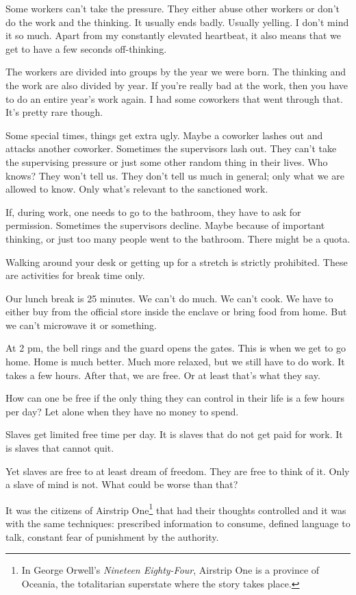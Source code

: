 Some workers can’t take the pressure. They either abuse other workers or don’t do the work and the thinking. It usually ends badly. Usually yelling. I don’t mind it so much. Apart from my constantly elevated heartbeat, it also means that we get to have a few seconds off-thinking.

The workers are divided into groups by the year we were born. The thinking and the work are also divided by year. If you’re really bad at the work, then you have to do an entire year’s work again. I had some coworkers that went through that. It’s pretty rare though.

Some special times, things get extra ugly. Maybe a coworker lashes out and attacks another coworker. Sometimes the supervisors lash out. They can’t take the supervising pressure or just some other random thing in their lives. Who knows? They won’t tell us. They don’t tell us much in general; only what we are allowed to know. Only what’s relevant to the sanctioned work.

If, during work, one needs to go to the bathroom, they have to ask for permission. Sometimes the supervisors decline. Maybe because of important thinking, or just too many people went to the bathroom. There might be a quota.

Walking around your desk or getting up for a stretch is strictly prohibited. These are activities for break time only.

Our lunch break is 25 minutes. We can’t do much. We can’t cook. We have to either buy from the official store inside the enclave or bring food from home. But we can’t microwave it or something.

At 2 pm, the bell rings and the guard opens the gates. This is when we get to go home. Home is much better. Much more relaxed, but we still have to do work. It takes a few hours. After that, we are free. Or at least that’s what they say.

How can one be free if the only thing they can control in their life is a few hours per day? Let alone when they have no money to spend.

Slaves get limited free time per day. It is slaves that do not get paid for work. It is slaves that cannot quit.

Yet slaves are free to at least dream of freedom. They are free to think of it. Only a slave of mind is not. What could be worse than that?

It was the citizens of Airstrip One\footnote{In George Orwell’s \emph{Nineteen Eighty-Four}, Airstrip One is a province of Oceania, the totalitarian superstate where the story takes place.} that had their thoughts controlled and it was with the same techniques: prescribed information to consume, defined language to talk, constant fear of punishment by the authority.

